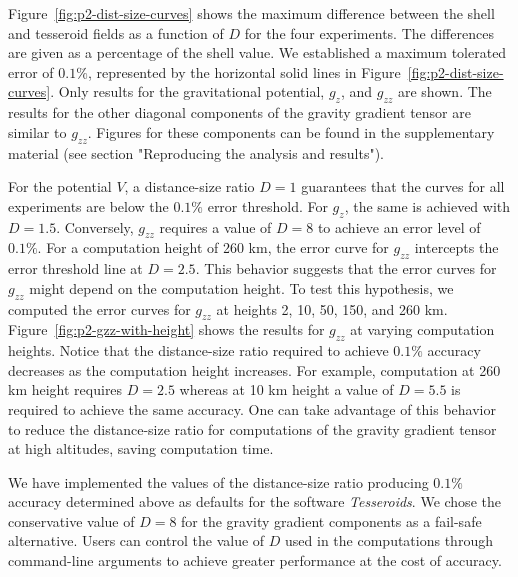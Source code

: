 Figure~\ref{fig:p2-dist-size-curves} shows
the maximum difference between the shell and tesseroid fields
as a function of $D$ for the four experiments.
The differences are given as a percentage of the shell value.
We established a maximum tolerated error of $0.1\%$, represented by the
horizontal solid lines in Figure~\ref{fig:p2-dist-size-curves}.
Only results for the gravitational potential, $g_z$, and $g_{zz}$ are shown.
The results for the other diagonal components of the gravity gradient tensor
are similar to $g_{zz}$.
Figures for these components can be found in the supplementary material
(see section "Reproducing the analysis and results").


For the potential $V$, a distance-size ratio $D=1$ guarantees that the curves
for all experiments are below the $0.1\%$ error threshold.
For $g_z$, the same is achieved with $D=1.5$.
Conversely, $g_{zz}$ requires a value of $D=8$ to achieve an error level of
$0.1\%$.
For a computation height of 260 km, the error curve for $g_{zz}$
intercepts the error threshold line at $D=2.5$.
This behavior suggests that the error curves for $g_{zz}$ might depend on the
computation height.
To test this hypothesis, we computed the error curves for $g_{zz}$ at
heights 2, 10, 50, 150, and 260 km.
Figure~\ref{fig:p2-gzz-with-height} shows the results for $g_{zz}$ at varying
computation heights.
Notice that the distance-size ratio required to achieve $0.1\%$ accuracy
decreases as the computation height increases.
For example, computation at 260 km height requires $D=2.5$ whereas at 10 km
height a value of $D=5.5$ is required to achieve the same accuracy.
One can take advantage of this behavior to reduce the distance-size ratio for
computations of the gravity gradient tensor at high altitudes,
saving computation time.


We have implemented the values of the distance-size ratio producing $0.1\%$
accuracy determined above as defaults for the software \emph{Tesseroids}.
We chose the conservative value of $D=8$ for the gravity gradient components
as a fail-safe alternative.
Users can control the value of $D$ used in the computations through
command-line arguments to achieve greater performance at the cost of
accuracy.



